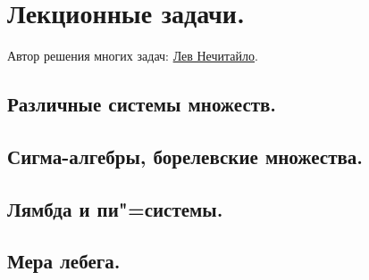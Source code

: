 \newpage
\section{Лекционные задачи.}
Автор решения многих задач: \href{https://vk.com/h0ho_haha}{Лев Нечитайло}.

\subsection{Различные системы множеств.}






\subsection{Сигма-алгебры, борелевские множества.}


\subsection{Лямбда и пи"=системы.}



\subsection{Мера лебега.}




